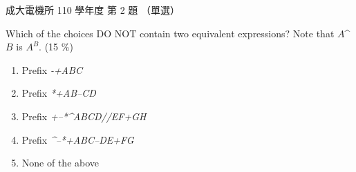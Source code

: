 \begin{pastexam}[label={px:ncku-110-ee-ds-02}]{成大電機所 110 學年度 第 2 題}
（單選）

Which of the choices DO NOT contain two equivalent expressions? Note that $A$\textasciicircum$B$ is
$A^B$. \hfill (15 \%)
\begin{enumerate}[label=(\alph*)]
\item {}  Prefix \quad \textit{-+ABC}
\item {}  Prefix \quad \textit{*+AB--CD}
\item {}  Prefix \quad
\textit{+--*\textasciicircum ABCD//EF+GH}
\item {}  Prefix \quad
\textit{\textasciicircum--*+ABC--DE+FG}
\item None of the above
\end{enumerate}
\end{pastexam}

